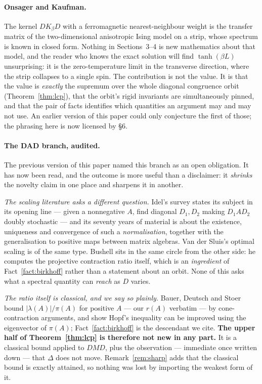 \documentclass[11pt,a4paper]{article}
\theoremstyle{plain}
\theoremstyle{definition}
\begin{document}
\paragraph{Onsager and Kaufman.} The kernel $DK_\beta D$ with a ferromagnetic
nearest-neighbour weight is the transfer matrix of the two-dimensional
anisotropic Ising model on a strip, whose spectrum is known in closed form.
Nothing in Sections~3--4 is new mathematics about that model, and the reader who
knows the exact solution will find $\tanh(\beta L)$ unsurprising: it is the
zero-temperature limit in the transverse direction, where the strip collapses to
a single spin. The contribution is not the value. It is that the value is
\emph{exactly} the supremum over the whole diagonal congruence orbit
(Theorem~\ref{thm:lcp}), that the orbit's rigid invariants are simultaneously
pinned, and that the pair of facts identifies which quantities an argument may
and may not use. An earlier version of this paper could only conjecture the
first of those; the phrasing here is now licensed by \S6.

\paragraph{The DAD branch, audited.} The previous version of this paper named
this branch as an open obligation. It has now been read, and the outcome is more
useful than a disclaimer: it \emph{shrinks} the novelty claim in one place and
sharpens it in another.

\emph{The scaling literature asks a different question.} Idel's survey
\cite{idel2016} states its subject in its opening line --- given a nonnegative
$A$, find diagonal $D_1,D_2$ making $D_1AD_2$ doubly stochastic --- and its
seventy years of material is about the existence, uniqueness and convergence of
such a \emph{normalisation}, together with the generalisation to positive maps
between matrix algebras. Van der Sluis's optimal scaling \cite{vandersluis1969}
is of the same type. Bushell \cite{bushell1973} sits in the same circle from the
other side: he computes the projective contraction ratio itself, which is an
\emph{ingredient} of Fact~\ref{fact:birkhoff} rather than a statement about an
orbit. None of this asks what a spectral quantity can \emph{reach} as $D$ varies.

\emph{The ratio itself is classical, and we say so plainly.} Bauer, Deutsch and
Stoer \cite{bauerdeutschstoer1969} bound $|\lambda(A)|/\pi(A)$ for positive $A$
--- our $r(A)$ verbatim --- by cone-contraction arguments, and show Hopf's
inequality can be improved using the eigenvector of $\pi(A)$;
Fact~\ref{fact:birkhoff} is the descendant we cite.
\textbf{The upper half of Theorem~\ref{thm:lcp} is therefore not new in any
part.} It is a classical bound applied to $DMD$, plus the observation --- immediate
once written down --- that $\Delta$ does not move. Remark~\ref{rem:sharp} adds
that the classical bound is exactly attained, so nothing was lost by importing
the weakest form of it.
\end{document}
